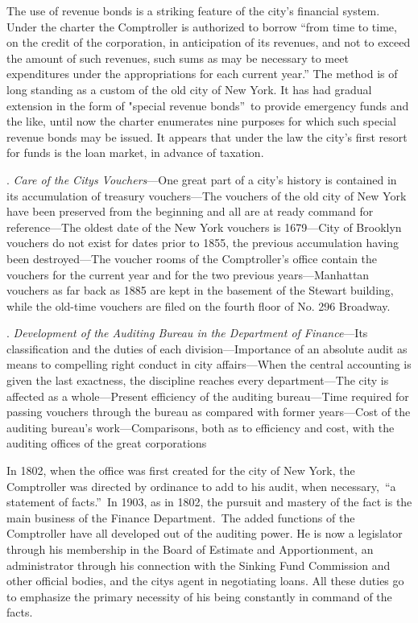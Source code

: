 \documentclass[openany,nobib]{tufte-book}
\begin{document}
The use of revenue bonds is a striking feature of the city's financial
system. Under the charter the Comptroller is authorized to borrow ``from
time to time, on the credit of the corporation, in anticipation of its
revenues, and not to exceed the amount of such revenues, such sums as
may be necessary to meet expenditures under the appropriations for each
current year.'' The method is of long standing as a custom of the old
city of New York. It has had gradual extension in the form of "special
revenue bonds''~to provide emergency funds and the like, until now the
charter enumerates nine purposes for which such special revenue bonds
may be issued. It appears that under the law the city's first resort for
funds is the loan market, in advance of taxation.~

\vspace{.15in}

.\emph{ Care of the City\textquotesingle s Vouchers}---One great part
of a city's history is contained in its accumulation of treasury
vouchers---The vouchers of the old city of New York have been preserved
from the beginning and all are at ready command for reference---The
oldest date of the New York vouchers is 1679---City of Brooklyn vouchers
do not exist for dates prior to 1855, the previous accumulation having
been destroyed---The voucher rooms of the Comptroller's office contain
the vouchers for the current year and for the two previous
years---Manhattan vouchers as far back as 1885 are kept in the basement
of the Stewart building, while the old-time vouchers are filed on the
fourth floor of No. 296 Broadway.~~

\vspace{.15in}

.\emph{ Development of the Auditing Bureau in the Department of
Finance}---Its classification and the duties of each
division---Importance of an absolute audit as means to compelling right
conduct in city affairs---When the central accounting is given the last
exactness, the discipline reaches every department---The city is
affected as a whole---Present efficiency of the auditing bureau---Time
required for passing vouchers through the bureau as compared with former
years---Cost of the auditing bureau's work---Comparisons, both as to
efficiency and cost, with the auditing offices of the great
corporations~

In 1802, when the office was first created for the city of New York, the
Comptroller was directed by ordinance to add to his audit, when
necessary,~``a statement of facts.''~In 1903, as in 1802, the pursuit
and mastery of the fact is the main business of the Finance
Department.~The added functions of the Comptroller have all developed
out of the auditing power. He is now a legislator through his membership
in the Board of Estimate and Apportionment, an administrator through his
connection with the Sinking Fund Commission and other official bodies,
and the city\textquotesingle s agent in negotiating loans. All these
duties go to emphasize the primary necessity of his being constantly in
command of the facts.~
\end{document}
